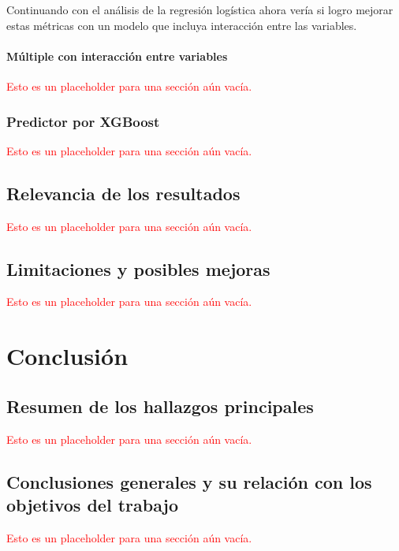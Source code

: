 \documentclass[a4paper]{report}
\begin{document}
Continuando con el análisis de la regresión logística ahora vería si logro mejorar estas métricas con un modelo que incluya interacción entre las variables.

\subsubsection{Múltiple con interacción entre variables}
\textcolor{red}{Esto es un placeholder para una sección aún vacía.}


\subsection{Predictor por XGBoost}
\textcolor{red}{Esto es un placeholder para una sección aún vacía.}



\section{Relevancia de los resultados}
\textcolor{red}{Esto es un placeholder para una sección aún vacía.}



\section{Limitaciones y posibles mejoras}
\textcolor{red}{Esto es un placeholder para una sección aún vacía.}




\chapter{Conclusión}

\section{Resumen de los hallazgos principales}
\textcolor{red}{Esto es un placeholder para una sección aún vacía.}



\section{Conclusiones generales y su relación con los objetivos del trabajo}
\textcolor{red}{Esto es un placeholder para una sección aún vacía.}
\end{document}
